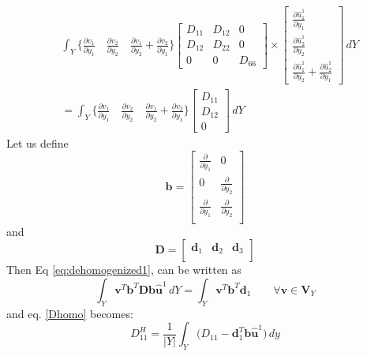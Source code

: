 \documentclass[10pt]{article}
\newcommand{\e}[1]{\textbf{#1}}
\begin{document}
\begin{equation}
\label{eq:dehomogenized1}
\begin{split}
&\int_Y\bigg\{\frac{\partial v_1}{\partial y_1}\quad\frac{\partial v_2}{\partial y_2}\quad\frac{\partial v_1}{\partial y_2}+\frac{\partial v_2}{\partial y_1}\bigg\}
\begin{bmatrix}
D_{11}	& D_{12} & 	0 \\
D_{12}	& D_{22} & 	0 \\
0		& 0		&	D_{66}
\end{bmatrix}\times
\begin{bmatrix}
\frac{\partial \hat u^1_1}{\partial y_1}\\
\frac{\partial \hat u^1_2}{\partial y_2}\\
\frac{\partial \hat u^1_1}{\partial y_2}+\frac{\partial \hat u^1_2}{\partial y_1}
\end{bmatrix}\,dY\\
&=\int_Y\bigg\{\frac{\partial v_1}{\partial y_1}\quad\frac{\partial v_2}{\partial y_2}\quad\frac{\partial v_1}{\partial y_2}+\frac{\partial v_2}{\partial y_1}\bigg\}
\begin{bmatrix}
D_{11}\\
D_{12}\\
0
\end{bmatrix}\,dY
\end{split}
\end{equation}
Let us define
\begin{equation}
\textbf{b} = \begin{bmatrix}
\frac{\partial}{\partial y_1} & 0\\
0 & \frac{\partial}{\partial y_2}\\
\frac{\partial}{\partial y_1} &\frac{\partial}{\partial y_2}\\
\end{bmatrix}
\end{equation}
and 
\begin{equation}
\textbf{D} = \begin{bmatrix}
\textbf{d}_1 & \textbf{d}_2 & \textbf{d}_3\\
\end{bmatrix}
\end{equation}
Then Eq \eqref{eq:dehomogenized1}, can be written as
\begin{equation}
\int_Y \textbf{v}^T \textbf{b}^T \textbf{D} \textbf{b}\hat{\e u}^1 \,dY = \int_Y\textbf{v}^T\textbf{b}^T\textbf{d}_1 \qquad \forall \textbf{v}\in\textbf{V}_Y
\end{equation}
and eq. \eqref{Dhomo} becomes:
\begin{equation}
\boxed{D^H_{11} = \frac{1}{|Y|}\int_Y\bigg (D_{11}-\textbf{d}_1^T\textbf{b}\hat{\e u}^1\bigg )\,dy
}
\end{equation}
\end{document}
